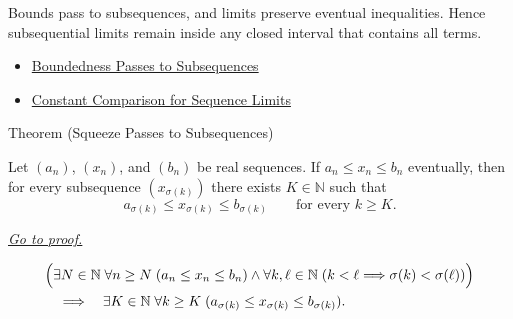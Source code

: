 \begin{remark*}[Interpretation]
Bounds pass to subsequences, and limits preserve eventual inequalities. Hence
subsequential limits remain inside any closed interval that contains all terms.
\end{remark*}

\begin{dependencies}
\begin{itemize}
  \item \hyperref[thm:boundedness-passes-to-subsequences]{Boundedness Passes to Subsequences}
  \item \hyperref[thm:constant-comparison-sequence-limits]{Constant Comparison for Sequence Limits}
\end{itemize}
\end{dependencies}


\begin{theorembox}{Theorem (Squeeze Passes to Subsequences)}
\begin{theorem}
\label{thm:squeeze-passes-to-subsequences}
Let $(a_n)$, $(x_n)$, and $(b_n)$ be real sequences. If
$a_n\le x_n\le b_n$ eventually, then for every subsequence
$(x_{\sigma(k)})$ there exists $K\in\mathbb{N}$ such that
\[
  a_{\sigma(k)}\le x_{\sigma(k)}\le b_{\sigma(k)}
  \qquad
  \text{for every } k\ge K.
\]

\smallskip
\noindent
\hyperref[prf:squeeze-passes-to-subsequences]{\textit{Go to proof.}}
\end{theorem}
\end{theorembox}

\begin{remark*}
\[
\begin{aligned}
&\Bigl(
  \exists N\in\mathbb{N}\;\forall n\ge N\;(a_n\le x_n\le b_n)
  \land
  \forall k,\ell\in\mathbb{N}\;(k<\ell\Longrightarrow\sigma(k)<\sigma(\ell))
\Bigr)\\
&\quad\Longrightarrow\quad
\exists K\in\mathbb{N}\;\forall k\ge K\;
(a_{\sigma(k)}\le x_{\sigma(k)}\le b_{\sigma(k)}).
\end{aligned}
\]
\end{remark*}

